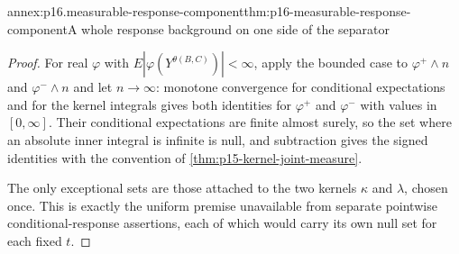 \begin{annexitem}{annex:p16.measurable-response-component}{thm:p16-measurable-response-component}{A whole response background on one side of the separator}
\begin{proof}
For real \(\varphi\) with \(E|\varphi(Y^{\theta(B,C)})|<\infty\), apply
the bounded case to \(\varphi^+\wedge n\) and \(\varphi^-\wedge n\) and
let \(n\to\infty\): monotone convergence for conditional expectations
and for the kernel integrals gives both identities for \(\varphi^+\) and
\(\varphi^-\) with values in \([0,\infty]\). Their conditional
expectations are finite almost surely, so the set where an absolute
inner integral is infinite is null, and subtraction gives the signed
identities with the convention of \cref{thm:p15-kernel-joint-measure}.

The only exceptional sets are those attached to the two kernels
\(\kappa\) and \(\lambda\), chosen once. This is exactly the uniform
premise unavailable from separate pointwise conditional-response
assertions, each of which would carry its own null set for each fixed
\(t\).
\end{proof}
\end{annexitem}

